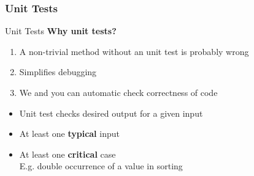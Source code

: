 \subsubsection{Unit Tests}
\begin{frame}{Unit Tests}
  \textbf{Why unit tests?}
  \begin{enumerate}
    \item
      A non-trivial method without an unit test is probably wrong
    \item<2- |handout:1>
      Simplifies debugging
    \item<3- |handout:1>
      We and you can automatic check correctness of code
  \end{enumerate}
  \vspace{1em}
  \begin{itemize}
    \item<5- |handout:1>
      Unit test checks desired output for a given input
    \item<6- |handout:1>
      At least one \textbf{typical} input
    \item<7- |handout:1>
      At least one \textbf{critical} case\\
      {\color{Hint}E.g. double occurrence of a value in sorting}
  \end{itemize}
\end{frame}



